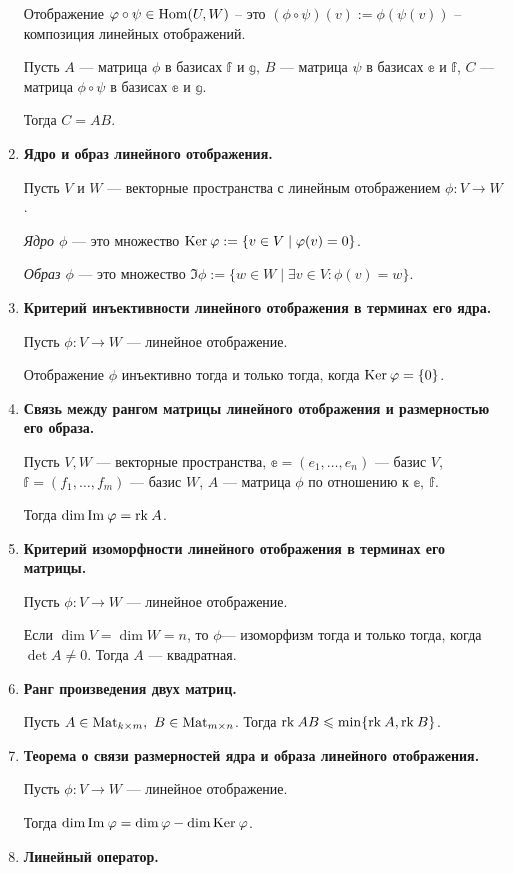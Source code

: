 \begin{enumerate}
Отображение $\varphi\circ\psi \in \mathrm{Hom}(U, W)$ -- это $(\phi\circ\psi)(v) := \phi(\psi(v))$ -- композиция линейных отображений.

Пусть $A$ --- матрица $\phi$ в базисах $\mathbb{f}$ и $\mathbb{g}$, $B$ --- матрица $\psi$ в базисах $\mathbb{e}$ и $\mathbb{f}$, $C$ --- матрица $\phi\circ\psi$ в базисах $\mathbb{e}$ и $\mathbb{g}$.

Тогда $C = AB$.
\item \textbf{Ядро и образ линейного отображения.}

Пусть $V$ и $W$ --- векторные пространства с линейным отображением $\phi: V \rightarrow W$.

\textit{Ядро $\phi$} --- это множество $\mathrm{Ker}\:\varphi := \{v \in V \mid \varphi(v) = 0 \}$.

\textit{Образ $\phi$} --- это множество $\Im \phi := \{w \in W \mid \exists v \in V : \phi(v) = w \}$.
\item \textbf{Критерий инъективности линейного отображения в терминах его ядра.}

Пусть $\phi\colon V \rightarrow W$ --- линейное отображение.

Отображение $\phi$ инъективно тогда и только тогда, когда $\mathrm{Ker}\: \varphi = \{0\}$.
\item \textbf{Связь между рангом матрицы линейного отображения и размерностью его образа.}

Пусть $V, W$ --- векторные пространства, $\mathbb{e} = (e_1, \ldots, e_n)$ --- базис $V$, $\mathbb{f} = (f_1, \ldots, f_m)$ --- базис $W$, $A$ --- матрица $\phi$ по отношению к $\mathbb{e},\ \mathbb{f}$.

Тогда $\dim \mathrm{Im\:} \varphi = \mathrm{rk}\: A$.
\item \textbf{Критерий изоморфности линейного отображения в терминах его матрицы.}

Пусть $\phi\colon V \rightarrow W$ --- линейное отображение.

Если $\dim V = \dim W = n$, то $\phi$--- изоморфизм тогда и только тогда, когда $\det A \neq 0$. Тогда $A$ --- квадратная.
\item \textbf{Ранг произведения двух матриц.}

Пусть $A \in \mathrm{Mat}_{k\times m},\ B\in \mathrm{Mat}_{m\times n}$. Тогда $\mathrm{rk}\: AB \leqslant \min\{\mathrm{rk}\: A, \mathrm{rk}\: B\}$.
\item \textbf{Теорема о связи размерностей ядра и образа линейного отображения.}

Пусть $\phi\colon V \rightarrow W$ --- линейное отображение.

Тогда $\dim \mathrm{Im\:} \varphi = \dim \varphi - \dim \mathrm{Ker}\: \varphi$.
\item \textbf{Линейный оператор.}


\end{enumerate}
